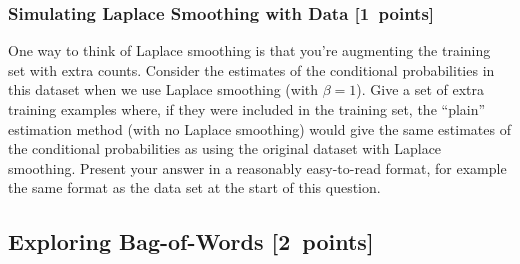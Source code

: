 \documentclass{article}
\newcommand{\blu}[1]{{\textcolor{blu}{#1}}}
\let\ask\blu
\newcommand\pts[1]{\textcolor{pointscolour}{[#1~points]}}
\begin{document}
    \subsubsection{Simulating Laplace Smoothing with Data \pts{1}}
    \label{laplace.conceptual}

    One way to think of Laplace smoothing is that you're augmenting the training set with extra counts. Consider the estimates of the conditional probabilities in this dataset when we use Laplace smoothing (with $\beta = 1$).
    \ask{Give a set of extra training examples where, if they were included in the training set, the ``plain'' estimation method (with no Laplace smoothing) would give the same estimates of the conditional probabilities as using the original dataset with Laplace smoothing.}
    Present your answer in a reasonably easy-to-read format, for example the same format as the data set at the start of this question.



    \subsection{Exploring Bag-of-Words \pts{2}}
\end{document}
